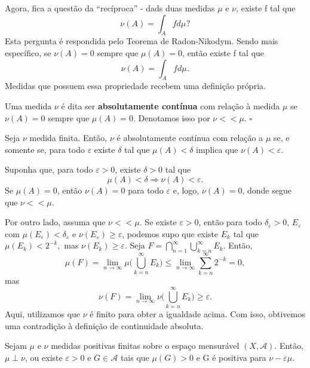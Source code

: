 \documentclass[measure_theory.tex]{subfiles}
\begin{document}
Agora, fica a questão da ``recíproca'' - dads duas medidas \(\mu \) e \(\nu \), existe f tal que
\[
	\nu (A) = \int_{A}f d\mu_{}?
\]
Esta pergunta é respondida pelo Teorema de Radon-Nikodym. Sendo mais específico, se \(\nu (A) = 0\) sempre que \(\mu (A) = 0\), então existe f tal que
\[
	\nu (A) = \int_{A}f d\mu_{}.
\]
Medidas que possuem essa propriedade recebem uma definição própria.
\begin{def*}
	Uma medida \(\nu \) é dita ser \textbf{absolutamente contínua} com relação à medida \(\mu \) se
	\(\nu (A) = 0\) sempre que \(\mu (A) = 0\). Denotamos isso por \(\nu <<\mu .\) \(\square\)
\end{def*}
\begin{prop*}
	Seja \(\nu \) medida finita. Então, \(\nu \) é absolutamente contínua com relação a \(\mu \) se, e somente se, para todo \(\varepsilon \) existe \(\delta \) tal que \(\mu (A) < \delta \) implica que \(\nu (A) < \varepsilon .\)
\end{prop*}
\begin{proof*}
	Suponha que, para todo \(\varepsilon > 0\), existe \(\delta > 0\) tal que
	\[
		\mu (A) < \delta \Rightarrow \nu (A) < \varepsilon .
	\]
	Se \(\mu (A) = 0\), então \(\nu (A) = 0\) para todo \(\varepsilon \) e, logo, \(\nu (A) = 0\), donde segue que \(\nu << \mu .\)

	Por outro lado, assuma que \(\nu <<\mu .\) Se existe \(\varepsilon > 0\), então para todo \(\delta_{\varepsilon } > 0\), \(E_{\varepsilon }\) com \(\mu (E_{\varepsilon }) < \delta_{\varepsilon } \) e \(\nu (E_{\varepsilon })\geq \varepsilon \), podemos supo que existe
	\(E_{k}\) tal que \(\mu (E_{k}) < 2^{-k},\) mas \(\nu (E_{k})\geq \varepsilon .\) Seja \(F = \bigcap_{n=1}^{\infty}\bigcup_{k=n}^{\infty}E_{k}.\) Então,
	\[
		\mu (F)=\lim_{n\to \infty}\mu \biggl(\bigcup_{k=n}^{\infty}E_{k}\biggr)\leq \lim_{n\to \infty}\sum\limits_{k=n}^{\infty}2^{-k} = 0,
	\]
	mas
	\[
		\nu (F) = \lim_{n\to \infty}\nu \biggl(\bigcup_{k=n}^{\infty}E_{k}\biggr)\geq \varepsilon .
	\]
	Aqui, utilizamos que \(\nu \) é finito para obter a igualdade acima. Com isso, obtivemos uma contradição à definição de continuidade absoluta.\qedsymbol
\end{proof*}
\begin{lemma*}
	Sejam \(\mu \) e \(\nu \) medidas positivas finitas sobre o espaço mensurável \((X, \mathcal{A}).\) Então, \(\mu \perp \nu \), ou existe \(\varepsilon > 0\) e \(G\in \mathcal{A}\) tais que \(\mu (G) > 0\) e G é positiva para \(\nu - \varepsilon \mu .\)
\end{lemma*}
\end{document}

